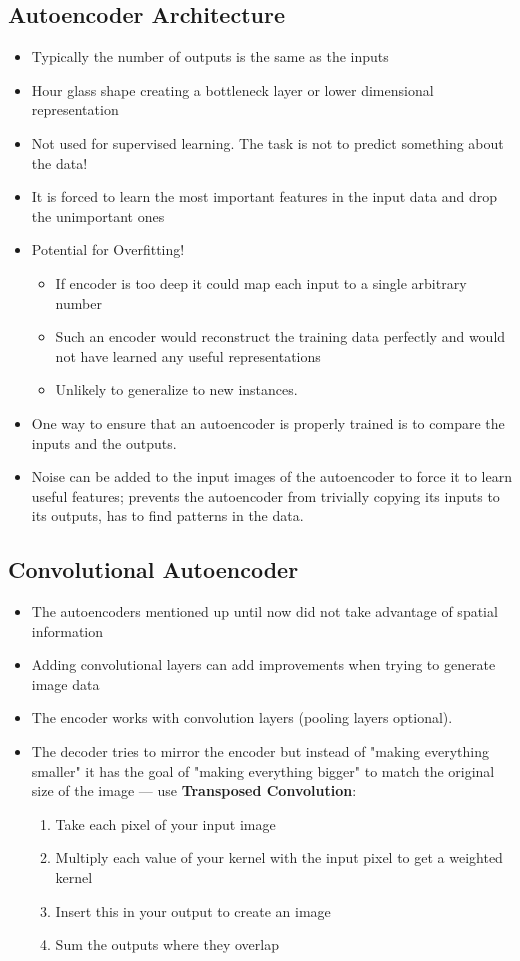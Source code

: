 \documentclass[11pt]{article}
\begin{document}
\subsection{Autoencoder Architecture}
\begin{itemize}
\item Typically the number of outputs is the same as the inputs
\item Hour glass shape creating a bottleneck layer or lower dimensional representation
\item Not used for supervised learning.  The task is not to predict something about the data!
\item It is forced to learn the most important features in the input data and drop the unimportant ones
\item Potential for Overfitting!
\begin{itemize}
\item If encoder is too deep it could map each
input to a single arbitrary number
\item Such an encoder would reconstruct the training data perfectly and would not have learned any useful representations
\item Unlikely to generalize to new instances.
\end{itemize}
\item One way to ensure that an autoencoder is properly trained is to compare the inputs and the outputs.
\item Noise can be added to the input images of the autoencoder to force it to learn useful features; prevents the autoencoder from trivially copying its inputs to its outputs, has to find patterns in the data.
\end{itemize}


\subsection{Convolutional Autoencoder}
\begin{itemize}
\item The autoencoders mentioned up until now did not take advantage of spatial information
\item Adding convolutional layers can add improvements when trying to generate image data
\item The encoder works with convolution layers (pooling layers optional).
\item The decoder tries to mirror the encoder but instead of "making everything smaller" it has the goal of "making everything bigger" to match the original size of the image --- use  \textbf{Transposed Convolution}:
\begin{enumerate}
\item Take each pixel of your input image
\item Multiply each value of your kernel with the input pixel to get a weighted kernel 
\item Insert this in your output to create an image
\item Sum the outputs where they overlap
\end{enumerate}
\end{itemize}
\end{document}
